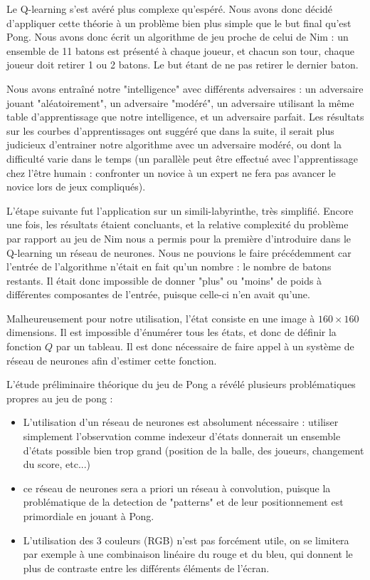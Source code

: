 \documentclass[
    10pt,
    a4paper,
    oneside,
    headinclude,footinclude,
    BCOR=5mm,
    captions=tableabove
]{scrartcl}
\begin{document}
Le Q-learning s'est avéré plus complexe qu'espéré. 
Nous avons donc décidé d'appliquer cette théorie  à un problème bien plus simple que le but final qu'est Pong. Nous avons donc écrit un algorithme de jeu proche de celui de Nim : un ensemble de 11 batons est présenté à chaque joueur, et chacun son tour, chaque joueur doit retirer 1 ou 2 batons. Le but étant de ne pas retirer le dernier baton.

Nous avons entraîné notre "intelligence" avec différents adversaires : un adversaire jouant "aléatoirement", un adversaire "modéré", un adversaire utilisant la même table d'apprentissage que notre intelligence, et un adversaire parfait. Les résultats sur les courbes d'apprentissages ont suggéré que dans la suite, il serait plus judicieux d'entrainer notre algorithme avec un adversaire modéré, ou dont la difficulté varie dans le temps (un parallèle peut être effectué avec l'apprentissage chez l'être humain : confronter un novice à un expert ne fera pas avancer le novice lors de jeux compliqués).

L'étape suivante fut l'application sur un simili-labyrinthe, très simplifié. Encore une fois, les résultats étaient concluants, et la relative complexité du problème par rapport au jeu de Nim nous a permis pour la première d'introduire dans le Q-learning un réseau de neurones. Nous ne pouvions le faire précédemment car l'entrée de l'algorithme n'était en fait qu'un nombre : le nombre de batons restants. Il était donc impossible de donner "plus" ou "moins" de poids à différentes composantes de l'entrée, puisque celle-ci n'en avait qu'une.

Malheureusement pour notre utilisation, l'état consiste en une image à $160 \times 160$ dimensions. Il est impossible d'énumérer tous les états, et donc de définir la fonction $Q$ par un tableau. Il est donc nécessaire de faire appel à un système de réseau de neurones afin d'estimer cette fonction.


L'étude préliminaire théorique du jeu de Pong a révélé plusieurs problématiques propres au jeu de pong :
\begin{itemize}
	\item L'utilisation d'un réseau de neurones est absolument nécessaire : utiliser simplement l'observation comme indexeur d'états donnerait un ensemble d'états possible bien trop grand (position de la balle, des joueurs, changement du score, etc...)
	\item ce réseau de neurones sera a priori un réseau à convolution, puisque la problématique de la detection de "patterns" et de leur positionnement est primordiale en jouant à Pong.
	\item L'utilisation des 3 couleurs (RGB) n'est pas forcément utile, on se limitera par exemple à une combinaison linéaire du rouge et du bleu, qui donnent le plus de contraste entre les différents éléments de l'écran.
\end{itemize}
\end{document}
